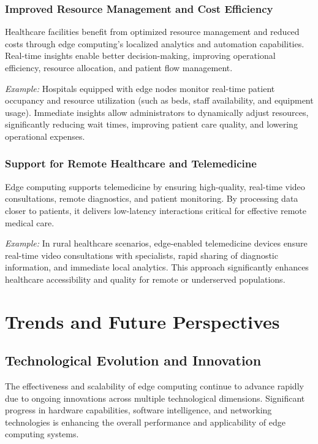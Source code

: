 \documentclass[runningheads]{llncs}
\begin{document}
\subsubsection{Improved Resource Management and Cost Efficiency}
Healthcare facilities benefit from optimized resource management and reduced costs through edge computing’s localized analytics and automation capabilities. Real-time insights enable better decision-making, improving operational efficiency, resource allocation, and patient flow management.

\textit{Example:} Hospitals equipped with edge nodes monitor real-time patient occupancy and resource utilization (such as beds, staff availability, and equipment usage). Immediate insights allow administrators to dynamically adjust resources, significantly reducing wait times, improving patient care quality, and lowering operational expenses.

\subsubsection{Support for Remote Healthcare and Telemedicine}
Edge computing supports telemedicine by ensuring high-quality, real-time video consultations, remote diagnostics, and patient monitoring. By processing data closer to patients, it delivers low-latency interactions critical for effective remote medical care.

\textit{Example:} In rural healthcare scenarios, edge-enabled telemedicine devices ensure real-time video consultations with specialists, rapid sharing of diagnostic information, and immediate local analytics. This approach significantly enhances healthcare accessibility and quality for remote or underserved populations.


\section{Trends and Future Perspectives}

\subsection{Technological Evolution and Innovation}

The effectiveness and scalability of edge computing continue to advance rapidly due to ongoing innovations across multiple technological dimensions. Significant progress in hardware capabilities, software intelligence, and networking technologies is enhancing the overall performance and applicability of edge computing systems.
\end{document}
